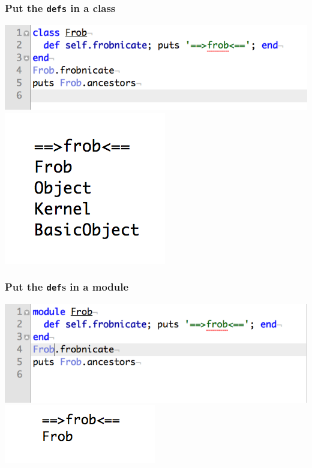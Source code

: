 \documentclass[slidestop,compress,mathserif]{beamer}
\begin{document}
\begin{frame}
	\frametitle{Put the \texttt{defs} in a class}
	\includegraphics[scale=0.45]{img/frob_classmethod.png} \\
	\vskip 0.25cm
	\includegraphics[scale=0.45]{img/frob_classmethod_output.png}		
\end{frame}

\begin{frame}
	\frametitle{Put the \texttt{def}s in a module}
	\includegraphics[scale=0.45]{img/frob_module.png} \\
	\vskip 0.25cm
	\includegraphics[scale=0.45]{img/frob_module_output.png}		
\end{frame}
\end{document}
